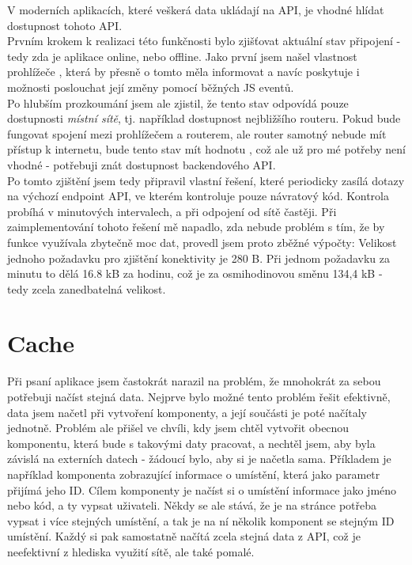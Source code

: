 V moderních aplikacích, které veškerá data ukládají na API, je vhodné hlídat dostupnost tohoto API.\\
Prvním krokem k realizaci této funkčnosti bylo zjišťovat aktuální stav připojení - tedy zda je aplikace online, nebo offline. Jako první jsem našel vlastnost prohlížeče  \cite{online}, která by přesně o tomto měla informovat a navíc poskytuje i možnosti poslouchat její změny pomocí běžných JS eventů.\\
Po hlubším prozkoumání jsem ale zjistil, že tento stav odpovídá pouze dostupnosti \emph{místní sítě}, tj. například dostupnost nejbližšího routeru. Pokud bude fungovat spojení mezi prohlížečem a routerem, ale router samotný nebude mít přístup k internetu, bude tento stav mít hodnotu , což ale už pro mé potřeby není vhodné - potřebuji znát dostupnost backendového API.\\
Po tomto zjištění jsem tedy připravil vlastní řešení, které periodicky zasílá dotazy na výchozí endpoint API, ve kterém kontroluje pouze návratový kód. Kontrola probíhá v minutových intervalech, a při odpojení od sítě častěji. Při zaimplementování tohoto řešení mě napadlo, zda nebude problém s tím, že by funkce využívala zbytečně moc dat, provedl jsem proto zběžné výpočty: Velikost jednoho požadavku pro zjištění konektivity je 280 B. Při jednom požadavku za minutu to dělá 16.8 kB za hodinu, což je za osmihodinovou směnu 134,4 kB - tedy zcela zanedbatelná velikost.


\section{Cache} \label{impl:cache}

Při psaní aplikace jsem častokrát narazil na problém, že mnohokrát za sebou potřebuji načíst stejná data. Nejprve bylo možné tento problém řešit efektivně, data jsem načetl při vytvoření komponenty, a její součásti je poté načítaly jednotně. Problém ale přišel ve chvíli, kdy jsem chtěl vytvořit obecnou komponentu, která bude s takovými daty pracovat, a nechtěl jsem, aby byla závislá na externích datech - žádoucí bylo, aby si je načetla sama. Příkladem je například komponenta zobrazující informace o umístění, která jako parametr přijímá jeho ID. Cílem komponenty je načíst si o umístění informace jako jméno nebo kód, a ty vypsat uživateli. Někdy se ale stává, že je na stránce potřeba vypsat i více stejných umístění, a tak je na ní několik komponent se stejným ID umístění. Každý si pak samostatně načítá zcela stejná data z API, což je neefektivní z hlediska využití sítě, ale také pomalé.\\

